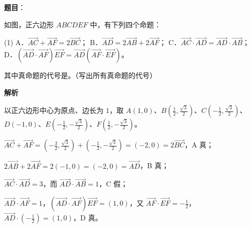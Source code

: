 \begin{answer}

\textbf{题目}：

如图，正六边形 $ABCDEF$ 中，有下列四个命题：

\begin{gkopts}(1)
\task A．$\overrightarrow{AC}+\overrightarrow{AF}=2\overrightarrow{BC}$；
\task B．$\overrightarrow{AD}=2\overrightarrow{AB}+2\overrightarrow{AF}$；
\task C．$\overrightarrow{AC}\cdot\overrightarrow{AD}=\overrightarrow{AD}\cdot\overrightarrow{AB}$；
\task D．$(\overrightarrow{AD}\cdot\overrightarrow{AF})\overrightarrow{EF}=\overrightarrow{AD}(\overrightarrow{AF}\cdot\overrightarrow{EF})$。
\end{gkopts}

其中真命题的代号是\gkblank{}。（写出所有真命题的代号）
\nopagebreak[4]
\begin{center}\end{center}
\nopagebreak[4]
\textbf{解析}

以正六边形中心为原点、边长为 $1$，取 $A(1,0)$、$B\left(\frac12,\frac{\sqrt3}2\right)$、$C\left(-\frac12,\frac{\sqrt3}2\right)$、$D(-1,0)$、$E\left(-\frac12,-\frac{\sqrt3}2\right)$、$F\left(\frac12,-\frac{\sqrt3}2\right)$。

$\overrightarrow{AC}+\overrightarrow{AF}=\left(-\frac32,\frac{\sqrt3}2\right)+\left(-\frac12,-\frac{\sqrt3}2\right)=(-2,0)=2\overrightarrow{BC}$，A 真；

$2\overrightarrow{AB}+2\overrightarrow{AF}=2(-1,0)=(-2,0)=\overrightarrow{AD}$，B 真；

$\overrightarrow{AC}\cdot\overrightarrow{AD}=3$，而 $\overrightarrow{AD}\cdot\overrightarrow{AB}=1$，C 假；

$\overrightarrow{AD}\cdot\overrightarrow{AF}=1$，$(\overrightarrow{AD}\cdot\overrightarrow{AF})\overrightarrow{EF}=(1,0)$，又 $\overrightarrow{AF}\cdot\overrightarrow{EF}=-\frac12$，$\overrightarrow{AD}\cdot\left(-\frac12\right)=(1,0)$，D 真。


\end{answer}
